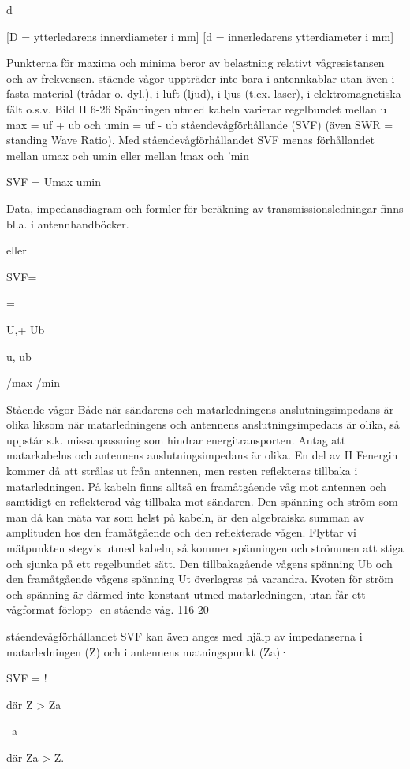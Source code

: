 {{{{d

[D = ytterledarens innerdiameter i mm]
[d = innerledarens ytterdiameter i mm]

Punkterna för maxima och minima beror
av belastning relativt vågresistansen och av
frekvensen.
stäende vågor uppträder inte bara i
antennkablar utan även i fasta material (trådar o. dyl.), i luft (ljud), i ljus (t.ex. laser), i
elektromagnetiska fält o.s.v.
Bild II 6-26
Spänningen utmed kabeln varierar regelbundet mellan
u max = uf + ub och umin = uf - ub
ståendevågförhållande (SVF)
(även SWR = standing Wave Ratio).
Med ståendevågförhållandet SVF menas
förhållandet mellan
umax och umin eller mellan !max och 'min

SVF = Umax
umin

Data, impedansdiagram och formler för
beräkning av transmissionsledningar finns
bl.a. i antennhandböcker.

eller

SVF=

=

U,+ Ub

u,-ub

/max
/min

Stående vågor
Både när sändarens och matarledningens
anslutningsimpedans är olika liksom när
matarledningens och antennens anslutningsimpedans är olika, så uppstår s.k. missanpassning som hindrar energitransporten.
Antag att matarkabelns och antennens
anslutningsimpedans är olika. En del av H Fenergin kommer då att strålas ut från antennen, men resten reflekteras tillbaka i matarledningen. På kabeln finns alltså en framåtgående våg mot antennen och samtidigt en
reflekterad våg tillbaka mot sändaren.
Den spänning och ström som man då
kan mäta var som helst på kabeln, är den
algebraiska summan av amplituden hos den
framåtgående och den reflekterade vågen.
Flyttar vi mätpunkten stegvis utmed kabeln, så kommer spänningen och strömmen
att stiga och sjunka på ett regelbundet sätt.
Den tillbakagående vågens spänning Ub
och den framåtgående vågens spänning Ut
överlagras på varandra. Kvoten för ström
och spänning är därmed inte konstant utmed matarledningen, utan får ett vågformat
förlopp- en stående våg.
116-20

ståendevågförhållandet SVF kan även
anges med hjälp av impedanserna i matarledningen (Z) och i antennens matningspunkt (Za)·

SVF = !

där Z > Za

~a

där Za > Z.

}}}}
